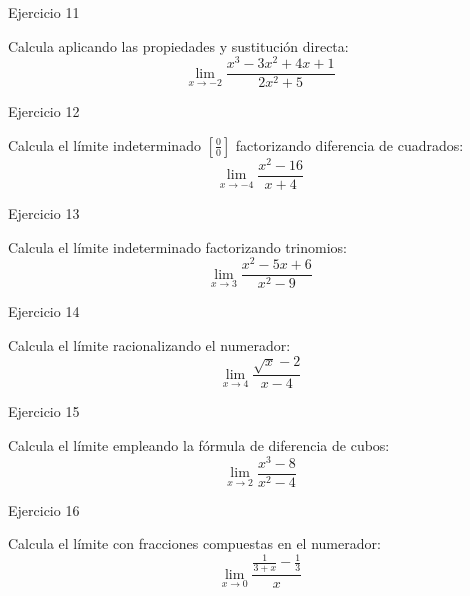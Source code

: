 \documentclass[aspectratio=169]{beamer}
\begin{document}
\begin{frame}{Ejercicio 11}
  \begin{mwejercicio}
    Calcula aplicando las propiedades y sustitución directa:
    $$\lim_{x \to -2} \frac{x^3 - 3x^2 + 4x + 1}{2x^2 + 5}$$
  \end{mwejercicio}
  \vspace{3.5cm}
\end{frame}
\begin{frame}{Ejercicio 12}
  \begin{mwejercicio}
    Calcula el límite indeterminado $\left[\frac{0}{0}\right]$ factorizando diferencia de cuadrados:
    $$\lim_{x \to -4} \frac{x^2 - 16}{x + 4}$$
  \end{mwejercicio}
  \vspace{3.5cm}
\end{frame}
\begin{frame}{Ejercicio 13}
  \begin{mwejercicio}
    Calcula el límite indeterminado factorizando trinomios:
    $$\lim_{x \to 3} \frac{x^2 - 5x + 6}{x^2 - 9}$$
  \end{mwejercicio}
  \vspace{3.5cm}
\end{frame}
\begin{frame}{Ejercicio 14}
  \begin{mwejercicio}
    Calcula el límite racionalizando el numerador:
    $$\lim_{x \to 4} \frac{\sqrt{x} - 2}{x - 4}$$
  \end{mwejercicio}
  \vspace{3.5cm}
\end{frame}
\begin{frame}{Ejercicio 15}
  \begin{mwejercicio}
    Calcula el límite empleando la fórmula de diferencia de cubos:
    $$\lim_{x \to 2} \frac{x^3 - 8}{x^2 - 4}$$
  \end{mwejercicio}
  \vspace{3.5cm}
\end{frame}
\begin{frame}{Ejercicio 16}
  \begin{mwejercicio}
    Calcula el límite con fracciones compuestas en el numerador:
    $$\lim_{x \to 0} \frac{\frac{1}{3 + x} - \frac{1}{3}}{x}$$
  \end{mwejercicio}
  \vspace{3.5cm}
\end{frame}
\end{document}
